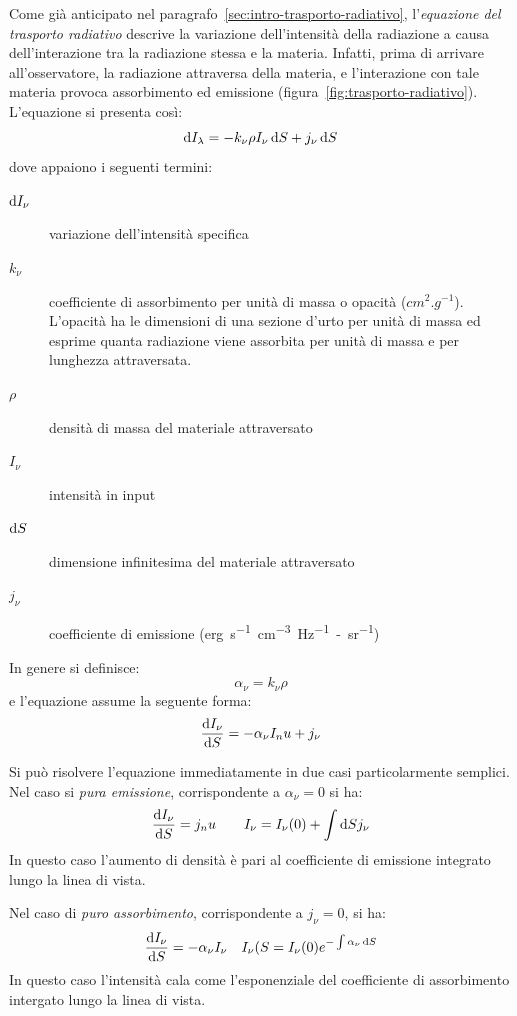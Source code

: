 Come già anticipato nel paragrafo~\ref{sec:intro-trasporto-radiativo}, l'\emph{equazione del trasporto radiativo} descrive la variazione dell'intensità della radiazione a causa dell'interazione tra la radiazione stessa e la materia. Infatti, prima di arrivare all'osservatore, la radiazione attraversa della materia, e l'interazione con tale materia provoca assorbimento ed emissione (figura~\ref{fig:trasporto-radiativo}). L'equazione si presenta così:
\begin{equation}\label{eq:trasporto-radiativo}
    \mathop{}\!\mathrm{d} I_\lambda = - k_\nu \rho I_\nu \mathop{}\!\mathrm{d} S + j_\nu \mathop{}\!\mathrm{d} S
\end{equation}
dove appaiono i seguenti termini:
\begin{description}
    \item[$\mathop{}\!\mathrm{d} I_\nu$] variazione dell'intensità specifica
    \item[$k_\nu$] coefficiente di assorbimento per unità di massa o opacità ($\si{cm^2.g^{-1}}$). L'opacità ha le dimensioni di una sezione d'urto per unità di massa ed esprime quanta radiazione viene assorbita per unità di massa e per lunghezza attraversata.
    \item[$\rho$] densità di massa del materiale attraversato
    \item[$I_\nu$] intensità in input
    \item[$\mathop{}\!\mathrm{d} S$] dimensione infinitesima del materiale attraversato
    \item[$j_\nu$] coefficiente di emissione (\si{erg.s^{-1}.cm^{-3}.Hz^{-1}-sr^{-1}})
\end{description}

In genere si definisce:
\[
\alpha_\nu = k_\nu \rho
\]
e l'equazione assume la seguente forma:
\begin{equation}\label{eq:trasporto-radiativo2}
    \frac{\mathop{}\!\mathrm{d} I_\nu}{\mathop{}\!\mathrm{d} S} = -\alpha_\nu I_nu + j_\nu
\end{equation}

Si può risolvere l'equazione immediatamente in due casi particolarmente semplici. Nel caso si \emph{pura emissione}, corrispondente a $\alpha_\nu = 0$ si ha:
\[
    \frac{\mathop{}\!\mathrm{d} I_\nu}{\mathop{}\!\mathrm{d} S} = j_nu \qquad I_\nu = I_\nu (0) + \int \mathop{}\!\mathrm{d} S j_\nu
\]
In questo caso l'aumento di densità è pari al coefficiente di emissione integrato lungo la linea di vista.

Nel caso di \emph{puro assorbimento}, corrispondente a $j_\nu = 0$, si ha:
\[
\frac{\mathop{}\!\mathrm{d} I_\nu}{\mathop{}\!\mathrm{d} S} = -\alpha_\nu I_\nu \quad 
I_\nu (S = I_\nu (0) e^{-\int \alpha_\nu \mathop{}\!\mathrm{d} S}
\]
In questo caso l'intensità cala come l'esponenziale del coefficiente di assorbimento intergato lungo la linea di vista.

